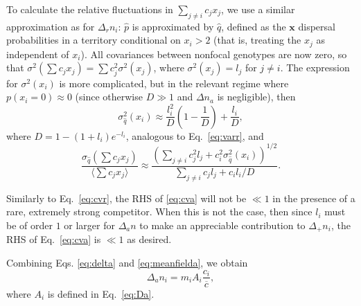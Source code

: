 \documentclass[11pt]{article}
\begin{document}
To calculate the relative fluctuations in $\sum_{j\neq i} c_j x_j$, we use a similar approximation as for $\Delta_r n_i$: $\hat{p}$ is approximated by $\hat{q}$, defined as the ${\mathbf x}$ dispersal probabilities in a territory conditional on $x_i>2$ (that is, treating the $x_j$ as independent of $x_i$). All covariances between nonfocal genotypes are now zero, so that $\sigma^2(\sum c_j x_j)=\sum c_j^2 \sigma^2(x_j)$, where $\sigma^2(x_j)=l_j$ for $j\neq i$. The expression for $\sigma^2(x_i)$ is more complicated, but in the relevant regime where $p(x_i=0)\approx 0$ (since otherwise $D\gg 1$ and $\Delta n_a$ is negligible), then
\begin{equation}
\sigma_{\hat{q}}^2(x_i)\approx\frac{l_i^2}{D}\left(1-\frac{1}{D}\right)+\frac{l_i}{D},
\end{equation}
where $D= 1-(1+l_i)e^{-l_i}$, analogous to Eq.~\eqref{eq:varr}, and 
\begin{equation}
\frac{\sigma_{\hat{q}}(\sum c_j x_j)}{\langle\sum c_j x_j\rangle} \approx\frac{\left(\sum_{j\neq i} c_j^2 l_j + c_i^2 \sigma_{\hat{q}}^2(x_i)\right)^{1/2}}{\sum_{j\neq i} c_j l_j + c_i l_i/D} \label{eq:cva}.
\end{equation}

Similarly to Eq.~\eqref{eq:cvr}, the RHS of \eqref{eq:cva} will not be $\ll 1$ in the presence of a rare, extremely strong competitor. When this is not the case, then since $l_i$ must be of order $1$ or larger for $\Delta_a n$ to make an appreciable contribution to $\Delta_+ n_i$, the RHS of Eq.~\eqref{eq:cva} is $\ll 1$ as desired. 

Combining Eqs. \eqref{eq:delta} and \eqref{eq:meanfielda}, we obtain
\begin{equation}
\Delta_a n_i=m_i A_i \frac{c_i}{\overline{c}},
\end{equation}
where $A_i$ is defined in Eq.~\eqref{eq:Da}.


\end{document}
